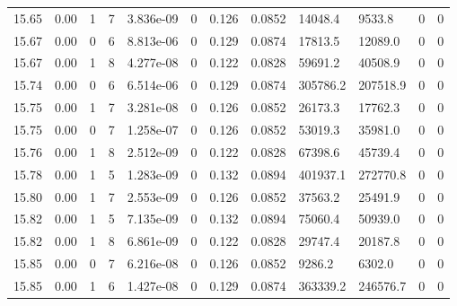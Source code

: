 \documentclass[preview]{standalone}
\begin{document}
{{{{{{{{{{{{{{{{{{{\begin{tabular}{L{1.2cm}C{1.2cm} C{0.3cm}C{0.5cm} C{1.4cm}C{1.4cm} C{1.4cm}C{1.4cm} C{1.6cm}C{1.6cm} C{1.6cm}C{1.6cm}}
  15.65  &  0.00  & 1     &  7 &  3.836e-09  & 0  &  0.126&   0.0852& 14048.4 & 9533.8   &  0 & 0  \\ 
  15.67  &  0.00  & 0     &  6 &  8.813e-06  & 0  &  0.129&   0.0874& 17813.5 & 12089.0   &  0 & 0  \\ 
  15.67  &  0.00  & 1     &  8 &  4.277e-08  & 0  &  0.122&   0.0828& 59691.2 & 40508.9   &  0 & 0  \\ 
  15.74  &  0.00  & 0     &  6 &  6.514e-06  & 0  &  0.129&   0.0874& 305786.2 & 207518.9   &  0 & 0  \\ 
  15.75  &  0.00  & 1     &  7 &  3.281e-08  & 0  &  0.126&   0.0852& 26173.3 & 17762.3   &  0 & 0  \\ 
  15.75  &  0.00  & 0     &  7 &  1.258e-07  & 0  &  0.126&   0.0852& 53019.3 & 35981.0   &  0 & 0  \\ 
  15.76  &  0.00  & 1     &  8 &  2.512e-09  & 0  &  0.122&   0.0828& 67398.6 & 45739.4   &  0 & 0  \\ 
  15.78  &  0.00  & 1     &  5 &  1.283e-09  & 0  &  0.132&   0.0894& 401937.1 & 272770.8   &  0 & 0  \\ 
  15.80  &  0.00  & 1     &  7 &  2.553e-09  & 0  &  0.126&   0.0852& 37563.2 & 25491.9   &  0 & 0  \\ 
  15.82  &  0.00  & 1     &  5 &  7.135e-09  & 0  &  0.132&   0.0894& 75060.4 & 50939.0   &  0 & 0  \\ 
  15.82  &  0.00  & 1     &  8 &  6.861e-09  & 0  &  0.122&   0.0828& 29747.4 & 20187.8   &  0 & 0  \\ 
  15.85  &  0.00  & 0     &  7 &  6.216e-08  & 0  &  0.126&   0.0852& 9286.2 & 6302.0   &  0 & 0  \\ 
  15.85  &  0.00  & 1     &  6 &  1.427e-08  & 0  &  0.129&   0.0874& 363339.2 & 246576.7   &  0 & 0  \\ 
\hline 
\end{tabular} 

}}}}}}}}}}}}}}}}}}}
\end{document}

